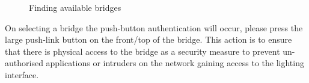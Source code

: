 \begin{figure}[H]
  \caption{Finding available bridges}
  \label{fig:findBridge}%
\end{figure}

On selecting a bridge the push-button authentication will occur, please
press the large push-link button on the front/top of the bridge. This
action is to ensure that there is physical access to the bridge as a
security measure to prevent un-authorised applications or intruders on
the network gaining access to the lighting interface.

